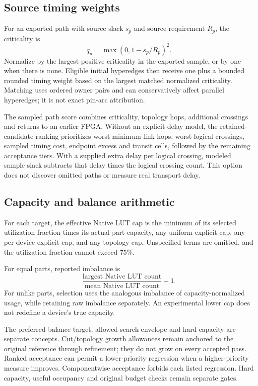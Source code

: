 \documentclass[11pt]{article}
\begin{document}
\subsection{Source timing weights}

For an exported path with source slack \(s_p\) and source requirement \(R_p\), the criticality is
\[
q_p=\max(0,1-s_p/R_p)^2.
\]
Normalize by the largest positive criticality in the exported sample, or by one when there is none. Eligible initial hyperedges then receive one plus a bounded rounded timing weight based on the largest matched normalized criticality. Matching uses ordered owner pairs and can conservatively affect parallel hyperedges; it is not exact pin-arc attribution.

The sampled path score combines criticality, topology hops, additional crossings and returns to an earlier FPGA. Without an explicit delay model, the retained-candidate ranking prioritizes worst minimum-link hops, worst logical crossings, sampled timing cost, endpoint excess and transit cells, followed by the remaining acceptance tiers. With a supplied extra delay per logical crossing, modeled sample slack subtracts that delay times the logical crossing count. This option does not discover omitted paths or measure real transport delay.

\subsection{Capacity and balance arithmetic}

For each target, the effective Native LUT cap is the minimum of its selected utilization fraction times its actual part capacity, any uniform explicit cap, any per-device explicit cap, and any topology cap. Unspecified terms are omitted, and the utilization fraction cannot exceed 75\%.

For equal parts, reported imbalance is
\[
\frac{\text{largest Native LUT count}}{\text{mean Native LUT count}}-1.
\]
For unlike parts, selection uses the analogous imbalance of capacity-normalized usage, while retaining raw imbalance separately. An experimental lower cap does not redefine a device's true capacity.

The preferred balance target, allowed search envelope and hard capacity are separate concepts. Cut/topology growth allowances remain anchored to the original reference through refinement; they do not grow on every accepted pass. Ranked acceptance can permit a lower-priority regression when a higher-priority measure improves. Componentwise acceptance forbids each listed regression. Hard capacity, useful occupancy and original budget checks remain separate gates.
\end{document}
